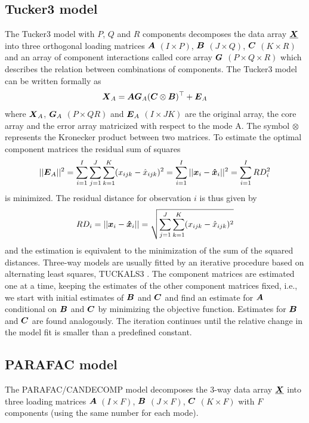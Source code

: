 \documentclass[article,shortnames, nojss]{jss}
\newcommand{\vv}[1]{\mbox{\boldmath$#1$}}
\begin{document}
\subsection{Tucker3 model}
The Tucker3 model \citep[see][]{Tucker:1966, bro:2000} with $P$, $Q$ and $R$
components decomposes the
data array $\vv{\underline{X}}$ into three orthogonal loading matrices
$\vv{A}$ $(I \times P)$, $\vv{B}$ $(J\times Q)$, $\vv{C}$ $(K\times R)$
and an array of component interactions called core array $\vv{G}$ $(P\times Q \times R)$ which
describes the relation between combinations of components.
The Tucker3 model can be written formally as
\begin{equation}
\label{eq:tucker3}
\vv{X}_A=\vv{AG}_A(\vv{C}\otimes \vv{B})^\top + \vv{E}_A
\end{equation}
where $\vv{X}_A$, $\vv{G}_A$ $(P \times Q R)$ and $\vv{E}_A$ $(I\times J K)$ are the original array, the core array and the error array matricized with respect to the mode A. The symbol $\otimes$ represents the Kronecker product between two matrices.
To estimate the optimal component matrices the residual sum of squares
\begin{equation}
\label{eq:RSS}
||\vv{E}_A||^2=\sum_{i=1}^I\sum_{j=1}^J\sum_{k=1}^K(x_{ijk}-\hat x_{ijk})^2 = \sum_{i=1}^I||\vv{x}_i - \vv{\hat x}_i ||^2 = \sum_{i=1}^I RD_i^2
\end{equation}
is minimized.
The residual distance for observation $i$ is thus given by
\begin{equation}
\label{eq:rdist}
RD_i = ||\vv{x}_i - \vv{\hat x}_i || = \sqrt{\sum_{j=1}^J\sum_{k=1}^K(x_{ijk}-\hat x_{ijk})^2}
\end{equation}
and the estimation is equivalent to the minimization of the sum of the squared distances.
Three-way models are usually fitted by an iterative procedure based on
alternating least squares, TUCKALS3 \citep{kroonenberg1980principal}. The component matrices are estimated
one at a time, keeping the estimates of the other component matrices fixed,
i.e., we start with initial estimates of $\vv{B}$ and $\vv{C}$ and find an
estimate for $\vv{A}$ conditional on $\vv{B}$ and $\vv{C}$ by minimizing
the objective function. Estimates for $\vv{B}$ and $\vv{C}$ are found
analogously. The iteration continues until the relative change in the
model fit is smaller than a predefined constant.
\subsection{PARAFAC model}
The PARAFAC/CANDECOMP model \citep[see][]{Carroll:1970, Harshman:1970}
decomposes the 3-way
data array $\vv{\underline{X}}$ into three loading matrices
$\vv{A}$ $(I \times F)$, $\vv{B}$ $(J\times F)$,
$\vv{C}$ $(K\times F)$ with $F$ components (using the same number for each mode).
\end{document}
